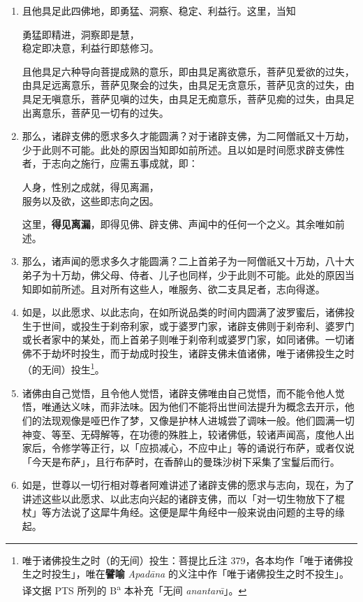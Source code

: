 \begin{enumerate}
\item 且他具足此四佛地，即勇猛、洞察、稳定、利益行。这里，当知\begin{quoting}勇猛即精进，洞察即是慧，\\稳定即决意，利益行即慈修习。\end{quoting}且他具足六种导向菩提成熟的意乐，即由具足离欲意乐，菩萨见爱欲的过失，由具足远离意乐，菩萨见聚会的过失，由具足无贪意乐，菩萨见贪的过失，由具足无嗔意乐，菩萨见嗔的过失，由具足无痴意乐，菩萨见痴的过失，由具足出离意乐，菩萨见一切有的过失。
\item 那么，诸辟支佛的愿求多久才能圆满？对于诸辟支佛，为二阿僧祇又十万劫，少于此则不可能。此处的原因当知即如前所述。且以如是时间愿求辟支佛性者，于志向之施行，应需五事成就，即：\begin{quoting}人身，性别之成就，得见离漏，\\服务以及欲，这些即志向之因。\end{quoting}这里，\textbf{得见离漏}，即得见佛、辟支佛、声闻中的任何一个之义。其余唯如前述。
\item 那么，诸声闻的愿求多久才能圆满？二上首弟子为一阿僧祇又十万劫，八十大弟子为十万劫，佛父母、侍者、儿子也同样，少于此则不可能。此处的原因当知即如前所述。且对所有这些人，唯服务、欲二支具足者，志向得遂。
\item 如是，以此愿求、以此志向，在如所说品类的时间内圆满了波罗蜜后，诸佛投生于世间，或投生于刹帝利家，或于婆罗门家，诸辟支佛则于刹帝利、婆罗门或长者家中的某处，而上首弟子则唯于刹帝利或婆罗门家，如同诸佛。一切诸佛不于劫坏时投生，而于劫成时投生，诸辟支佛未值诸佛，唯于诸佛投生之时（的无间）投生\footnote{唯于诸佛投生之时（的无间）投生：菩提比丘注 379，各本均作「唯于诸佛投生之时投生」，唯在\textbf{譬喻} \textit{Apadāna} 的义注中作「唯于诸佛投生之时不投生」。译文据 PTS 所列的 B\textsuperscript{a} 本补充「无间 \textit{anantarā}」。}。
\item 诸佛由自己觉悟，且令他人觉悟，诸辟支佛唯由自己觉悟，而不能令他人觉悟，唯通达义味，而非法味。因为他们不能将出世间法提升为概念去开示，他们的法现观像是哑巴作了梦，又像是护林人进城尝了调味一般。他们圆满一切神变、等至、无碍解等，在功德的殊胜上，较诸佛低，较诸声闻高，度他人出家后，令修学等正行，以「应损减心，不应中止」等的诵说行布萨，或者仅说「今天是布萨」，且行布萨时，在香醉山的曼珠沙树下采集了宝鬘后而行。
\item 如是，世尊以一切行相对尊者阿难讲述了诸辟支佛的愿求与志向，现在，为了讲述这些以此愿求、以此志向兴起的诸辟支佛，而以「对一切生物放下了棍杖」等方法说了这犀牛角经。这便是犀牛角经中一般来说由问题的主导的缘起。\end{enumerate}

